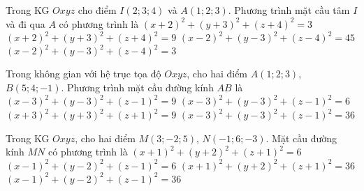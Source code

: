 \begin{ex}%
	Trong KG $Oxyz$ cho điểm $I(2;3;4)$ và $A(1;2;3)$. Phương trình mặt cầu tâm $I$ và đi qua $A$ có phương trình là
	\choice
	{$(x+2)^2+(y+3)^2+(z+4)^2=3$}
	{$(x+2)^2+(y+3)^2+(z+4)^2=9$}
	{$(x-2)^2+(y-3)^2+(z-4)^2=45$}
	{\True $(x-2)^2+(y-3)^2+(z-4)^2=3$}
\end{ex}

\begin{ex}%
	Trong không gian với hệ trục tọa độ $Oxyz$, cho hai điểm $A(1;2;3)$, $B(5;4;-1)$. Phương trình mặt cầu đường kính $AB$ là
	\choice
	{\True $(x-3)^2+(y-3)^2+(z-1)^2=9$}
	{$(x-3)^2+(y-3)^2+(z-1)^2=6$}
	{$(x+3)^2+(y+3)^2+(z+1)^2=9$}
	{$(x-3)^2+(y-3)^2+(z-1)^2=36$}
\end{ex}

\begin{ex}%
	Trong KG $Oxyz$, cho hai điểm $M(3;-2;5)$, $N(-1;6;-3)$. Mặt cầu đường kính $MN$ có phương trình là
	\choice
	{$(x+1)^2+(y+2)^2+(z+1)^2=6$}
	{$(x-1)^2+(y-2)^2+(z-1)^2=6$}
	{$(x+1)^2+(y+2)^2+(z+1)^2=36$}
	{\True $(x-1)^2+(y-2)^2+(z-1)^2=36$}
\end{ex}

